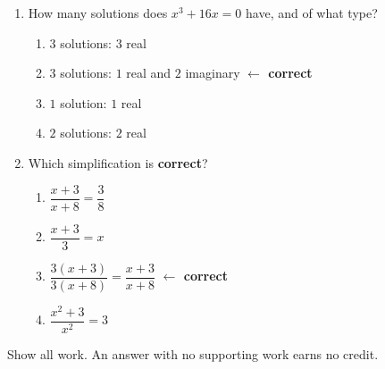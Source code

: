 \begin{enumerate}[leftmargin=1.8em, itemsep=6pt, topsep=5pt]
\item How many solutions does $x^3+16x=0$ have, and of what type?
\begin{enumerate}[label=(\Alph*), leftmargin=2.2em, itemsep=1pt, topsep=2pt]
  \item $3$ solutions: $3$ real
  \item $3$ solutions: $1$ real and $2$ imaginary \quad \textcolor{keyred}{\textbf{$\leftarrow$ correct}}
  \item $1$ solution: $1$ real
  \item $2$ solutions: $2$ real
\end{enumerate}

\item Which simplification is \textbf{correct}?
\begin{enumerate}[label=(\Alph*), leftmargin=2.2em, itemsep=1pt, topsep=2pt]
  \item $\dfrac{x+3}{x+8} = \dfrac{3}{8}$
  \item $\dfrac{x+3}{3} = x$
  \item $\dfrac{3(x+3)}{3(x+8)} = \dfrac{x+3}{x+8}$ \quad \textcolor{keyred}{\textbf{$\leftarrow$ correct}}
  \item $\dfrac{x^2+3}{x^2} = 3$
\end{enumerate}

\end{enumerate}


\noindent\small Show all work. An answer with no supporting work earns no credit.

